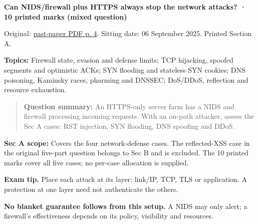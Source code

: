 \documentclass[11pt,a4paper]{article}
\begin{document}
\textbf{Can NIDS/\allowbreak{}firewall plus HTTPS always stop the network attacks? · 10 printed marks (mixed question)}


Original: \href{../../CSE405-Security_Merged.pdf\#page=4}{past-paper PDF p. 4}. Sitting date: 06 September 2025. Printed Section A.


\textbf{Topics:} Firewall state,\allowbreak{} evasion and defense limits; TCP hijacking,\allowbreak{} spoofed segments and optimistic ACKs; SYN flooding and stateless SYN cookies; DNS poisoning,\allowbreak{} Kaminsky races,\allowbreak{} pharming and DNSSEC; DoS/\allowbreak{}DDoS,\allowbreak{} reflection and resource exhaustion.



\begin{quote}\small

\textbf{Question summary:} An HTTPS-only server farm has a NIDS and firewall processing incoming requests. With an on-path attacker,\allowbreak{} assess the Sec A cases: RST injection,\allowbreak{} SYN flooding,\allowbreak{} DNS spoofing and DDoS.



\end{quote}

\textbf{Sec A scope:} Covers the four network-defense cases. The reflected-XSS case in the original five-part question belongs to Sec B and is excluded. The 10 printed marks cover all five cases; no per-case allocation is supplied.



{\color{ForestGreen}\textbf{Exam tip.} Place each attack at its layer: link/\allowbreak{}IP,\allowbreak{} TCP,\allowbreak{} TLS or application. A protection at one layer need not authenticate the others.}


\textbf{No blanket guarantee follows from this setup.} A NIDS may only alert; a firewall's effectiveness depends on its policy,\allowbreak{} visibility and resources.
\end{document}
